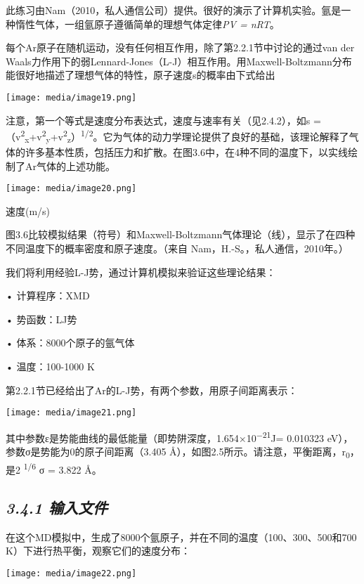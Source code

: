 \documentclass[
]{article}
\begin{document}
此练习由Nam（2010，私人通信公司）提供。很好的演示了计算机实验。氩是一种惰性气体，一组氩原子遵循简单的理想气体定律\emph{PV
= nRT}。

每个Ar原子在随机运动，没有任何相互作用，除了第2.2.1节中讨论的通过van der
Waals力作用下的弱Lennard-Jones（L-J）相互作用。用Maxwell-Boltzmann分布能很好地描述了理想气体的特性，原子速度s的概率由下式给出

\texttt{[image: media/image19.png]}

注意，第一个等式是速度分布表达式，速度与速率有关（见2.4.2），如s
=（v\textsuperscript{2}\textsubscript{x}+v\textsuperscript{2}\textsubscript{y}+v\textsuperscript{2}\textsubscript{z}）\textsuperscript{1/2}。它为气体的动力学理论提供了良好的基础，该理论解释了气体的许多基本性质，包括压力和扩散。在图3.6中，在4种不同的温度下，以实线绘制了Ar气体的上述功能。

\texttt{[image: media/image20.png]}

速度(m/s)

图3.6比较模拟结果（符号）和Maxwell-Boltzmann气体理论（线），显示了在四种不同温度下的概率密度和原子速度。（来自
Nam，H.-S。，私人通信，2010年。）

我们将利用经验L-J势，通过计算机模拟来验证这些理论结果：

• 计算程序：XMD

• 势函数：LJ势

• 体系：8000个原子的氩气体

• 温度：100-1000 K

第2.2.1节已经给出了Ar的L-J势，有两个参数，用原子间距离表示：

\texttt{[image: media/image21.png]}

其中参数ε是势能曲线的最低能量（即势阱深度，1.654×10\textsuperscript{−21}J=
0.010323 eV），参数σ是势能为0的原子间距离（3.405
Å），如图2.5所示。请注意，平衡距离，r\textsubscript{0}，是2
\textsuperscript{1/6} σ = 3.822 Å。

\hypertarget{ux8f93ux5165ux6587ux4ef6-2}{%
\subsection{\texorpdfstring{\emph{3.4.1
输入文件}}{3.4.1 输入文件}}\label{ux8f93ux5165ux6587ux4ef6-2}}

在这个MD模拟中，生成了8000个氩原子，并在不同的温度（100、300、500和700
K）下进行热平衡，观察它们的速度分布：

\texttt{[image: media/image22.png]}
\end{document}
